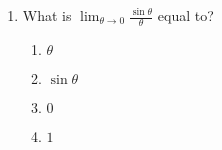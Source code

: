\documentclass[journal]{IEEEtran}
\begin{document}
\begin{enumerate}
             
\item What is $\lim_{\theta \to 0} \frac{\sin \theta}{\theta}$ equal to?
    \begin{multicols}{2}

\begin{enumerate}
    \item $\theta$
    \item $\sin \theta$
    \item $0$
    \item $1$

    
\end{enumerate}
    \end{multicols}



\end{enumerate}

        
     
\end{document}
